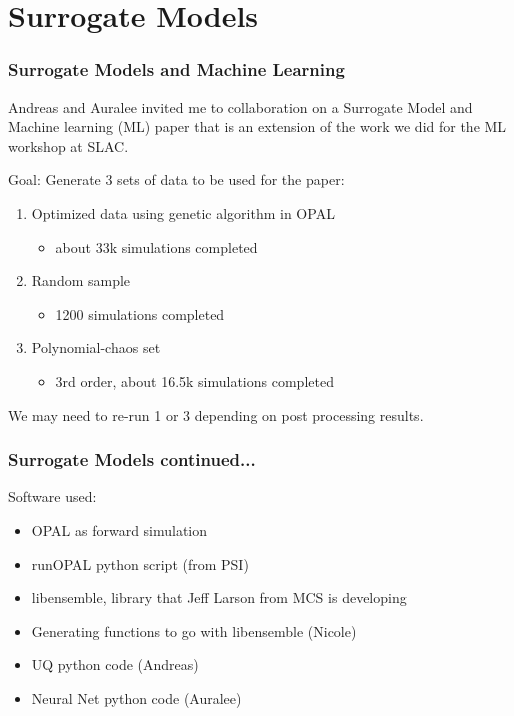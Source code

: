 \documentclass[professionalfonts,t]{beamer}
\begin{document}
\section{Surrogate Models}
\begin{frame}
	\frametitle{Surrogate Models and Machine Learning}
	Andreas and Auralee invited me to collaboration on a Surrogate Model and Machine learning (ML) paper that is an extension of the work we did for the ML workshop at SLAC.
	\vspace{1em}	
	
	Goal: Generate 3 sets of data to be used for the paper:
	\begin{enumerate}
		\item Optimized data using genetic algorithm in OPAL 
			\begin{itemize}
				\item about 33k simulations completed
			\end{itemize}

		\item Random sample 
		\begin{itemize}
			\item 1200 simulations completed
		\end{itemize}
		\item Polynomial-chaos set 
		\begin{itemize}
			\item 3rd order, about 16.5k simulations completed
		\end{itemize}
	\end{enumerate}
	\vspace{1em}
	We may need to re-run 1 or 3 depending on post processing results.
\end{frame}

\begin{frame}
	\frametitle{Surrogate Models continued...}
	Software used:
	\begin{itemize}
		\item OPAL as forward simulation
		\item runOPAL python script (from PSI)
		\item libensemble, library that Jeff Larson from MCS is developing
		\item Generating functions to go with libensemble (Nicole)
		\item UQ python code  (Andreas)
		\item Neural Net python code (Auralee)
	\end{itemize}
		
\end{frame}
\end{document}
